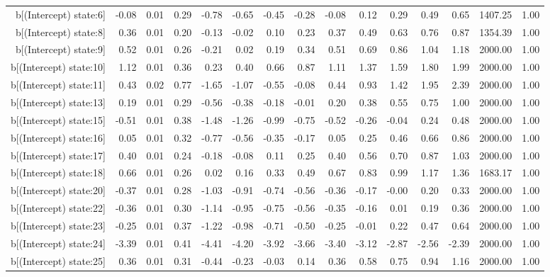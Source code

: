 \begin{table}[ht]
\begin{tabular}{rrrrrrrrrrrrrrr}
  b[(Intercept) state:6] & -0.08 & 0.01 & 0.29 & -0.78 & -0.65 & -0.45 & -0.28 & -0.08 & 0.12 & 0.29 & 0.49 & 0.65 & 1407.25 & 1.00 \\ 
  b[(Intercept) state:8] & 0.36 & 0.01 & 0.20 & -0.13 & -0.02 & 0.10 & 0.23 & 0.37 & 0.49 & 0.63 & 0.76 & 0.87 & 1354.39 & 1.00 \\ 
  b[(Intercept) state:9] & 0.52 & 0.01 & 0.26 & -0.21 & 0.02 & 0.19 & 0.34 & 0.51 & 0.69 & 0.86 & 1.04 & 1.18 & 2000.00 & 1.00 \\ 
  b[(Intercept) state:10] & 1.12 & 0.01 & 0.36 & 0.23 & 0.40 & 0.66 & 0.87 & 1.11 & 1.37 & 1.59 & 1.80 & 1.99 & 2000.00 & 1.00 \\ 
  b[(Intercept) state:11] & 0.43 & 0.02 & 0.77 & -1.65 & -1.07 & -0.55 & -0.08 & 0.44 & 0.93 & 1.42 & 1.95 & 2.39 & 2000.00 & 1.00 \\ 
  b[(Intercept) state:13] & 0.19 & 0.01 & 0.29 & -0.56 & -0.38 & -0.18 & -0.01 & 0.20 & 0.38 & 0.55 & 0.75 & 1.00 & 2000.00 & 1.00 \\ 
  b[(Intercept) state:15] & -0.51 & 0.01 & 0.38 & -1.48 & -1.26 & -0.99 & -0.75 & -0.52 & -0.26 & -0.04 & 0.24 & 0.48 & 2000.00 & 1.00 \\ 
  b[(Intercept) state:16] & 0.05 & 0.01 & 0.32 & -0.77 & -0.56 & -0.35 & -0.17 & 0.05 & 0.25 & 0.46 & 0.66 & 0.86 & 2000.00 & 1.00 \\ 
  b[(Intercept) state:17] & 0.40 & 0.01 & 0.24 & -0.18 & -0.08 & 0.11 & 0.25 & 0.40 & 0.56 & 0.70 & 0.87 & 1.03 & 2000.00 & 1.00 \\ 
  b[(Intercept) state:18] & 0.66 & 0.01 & 0.26 & 0.02 & 0.16 & 0.33 & 0.49 & 0.67 & 0.83 & 0.99 & 1.17 & 1.36 & 1683.17 & 1.00 \\ 
  b[(Intercept) state:20] & -0.37 & 0.01 & 0.28 & -1.03 & -0.91 & -0.74 & -0.56 & -0.36 & -0.17 & -0.00 & 0.20 & 0.33 & 2000.00 & 1.00 \\ 
  b[(Intercept) state:22] & -0.36 & 0.01 & 0.30 & -1.14 & -0.95 & -0.75 & -0.56 & -0.35 & -0.16 & 0.01 & 0.19 & 0.36 & 2000.00 & 1.00 \\ 
  b[(Intercept) state:23] & -0.25 & 0.01 & 0.37 & -1.22 & -0.98 & -0.71 & -0.50 & -0.25 & -0.01 & 0.22 & 0.47 & 0.64 & 2000.00 & 1.00 \\ 
  b[(Intercept) state:24] & -3.39 & 0.01 & 0.41 & -4.41 & -4.20 & -3.92 & -3.66 & -3.40 & -3.12 & -2.87 & -2.56 & -2.39 & 2000.00 & 1.00 \\ 
  b[(Intercept) state:25] & 0.36 & 0.01 & 0.31 & -0.44 & -0.23 & -0.03 & 0.14 & 0.36 & 0.58 & 0.75 & 0.94 & 1.16 & 2000.00 & 1.00 \\ 

\end{tabular}
\end{table}
